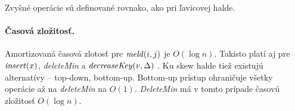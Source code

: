 Zvyšné operácie sú definované rovnako, ako pri ľavicovej halde.

\paragraph{Časová zložitosť.}
Amortizovaná časová zlotosť pre $\mathop{\mathit{meld}}(i,j)$ je $O(\log n)$.
Takisto platí aj pre $\mathop{\mathit{insert}}(x)$, \emph{deleteMin} a $\mathop{\mathit{decreaseKey}}(v,\Delta)$ \citep{skew}.
Ku skew halde tiež existujú alternatívy -- top-down, bottom-up. 
Bottom-up prístup ohraničuje všetky operácie až na \emph{deleteMin} na $O(1)$.
\emph{DeleteMin} má v tomto prípade časovú zložitosť $O(\log n)$.
